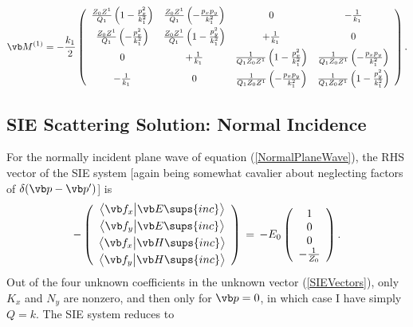 \documentclass{article}
\renewcommand{\inp}[2]{ \big\langle #1 \big| #2 \big\rangle}
\begin{document}
$$ \vb M^{(1)}=
   -\frac{k_1}{2}
    \left(\begin{array}{cccc}
    \frac{Z_0Z^1}{Q_1}\left(1-\frac{p_x^2}{k_1^2}\right)
  &
    \frac{Z_0Z^1}{Q_1}\left(-\frac{p_xp_y}{k_1^2}\right)
  & 0 
  & -\frac{1}{k_1}
 \\[6pt]
    \frac{Z_0Z^1}{Q_1}\left(-\frac{p_x^2}{k_1^2}\right)
  &
    \frac{Z_0Z^1}{Q_1}\left(1-\frac{p_y^2}{k_1^2}\right)
  & +\frac{1}{k_1}
  & 0 
 \\[6pt]
    0
  & +\frac{1}{k_1}
  & \frac{1}{Q_1 Z_0 Z^1} \left(1-\frac{p_x^2}{k_1^2}\right)
  & \frac{1}{Q_1 Z_0 Z^1} \left(-\frac{p_xp_y }{k_1^2}\right)
 \\[6pt]
   -\frac{1}{k_1}
  & 0
  & \frac{1}{Q_1 Z_0 Z^1} \left(-\frac{p_xp_y}{k_1^2}\right)
  & \frac{1}{Q_1 Z_0 Z^1} \left(1-\frac{p_y^2}{k_1^2}\right)
   \end{array}\right).
$$

\subsection{SIE Scattering Solution: Normal Incidence}
For the normally incident plane wave of equation 
(\ref{NormalPlaneWave}), the RHS vector of the SIE system 
[again being somewhat cavalier about neglecting 
factors of $\delta(\vb p-\vb p^\prime)$] is 
$$-
 \left(\begin{array}{c}
 \inp{\vb f_{x}}{\vb E\sups{inc}} \\[3pt]
 \inp{\vb f_{y}}{\vb E\sups{inc}} \\[3pt]
 \inp{\vb f_{x}}{\vb H\sups{inc}} \\[3pt]
 \inp{\vb f_{y}}{\vb H\sups{inc}}
 \end{array}\right)
\,=\,
  -E_0 
 \left(\begin{array}{c}
 1 \\ 
 0 \\ 
 0 \\ 
 -\frac{1}{Z_0}
 \end{array}\right).
$$
Out of the four unknown coefficients in the unknown
vector (\ref{SIEVectors}), only $K_x$ and $N_y$ are 
nonzero, and then only for $\vb p=0$, in which
case I have simply $Q=k$.
The SIE system reduces to 
\end{document}
